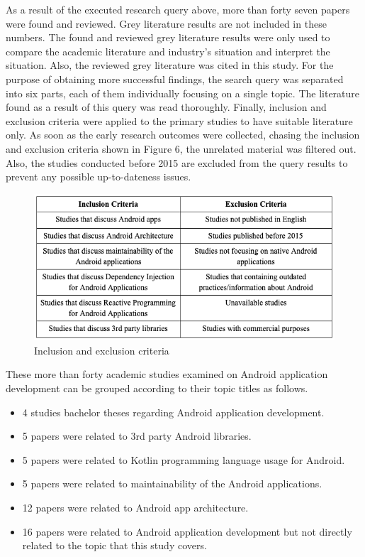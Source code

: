 As a result of the executed research query above, more than forty seven papers were found and reviewed. Grey literature results are not included in these numbers. The found and reviewed grey literature results were only used to compare the academic literature and industry's situation and interpret the situation. Also, the reviewed grey literature was cited in this study. For the purpose of obtaining more successful findings, the search query was separated into six parts, each of them individually focusing on a single topic. The literature found as a result of this query was read thoroughly. Finally, inclusion and exclusion criteria were applied to the primary studies to have suitable literature only. As soon as the early research outcomes were collected, chasing the inclusion and exclusion criteria shown in Figure 6, the unrelated material was filtered out. Also, the studies conducted before 2015 are excluded from the query results to prevent any possible up-to-dateness issues.
\begin{figure}[ht!]
    \centering
    \includegraphics[scale=0.6]{figures/research_query_criteria.png}
    \caption{Inclusion and exclusion criteria}
    \label{fig:lit_review_research_query_criteria}
\end{figure}

These more than forty academic studies examined on Android application development can be grouped according to their topic titles as follows.
\begin{itemize}
    \item 4 studies bachelor theses regarding Android application development.
    \item 5 papers were related to 3rd party Android libraries.
    \item 5 papers were related to Kotlin programming language usage for Android.
    \item 5 papers were related to maintainability of the Android applications.
    \item 12 papers were related to Android app architecture.
    \item 16 papers were related to Android application development but not directly related to the topic that this study covers.
\end{itemize}

